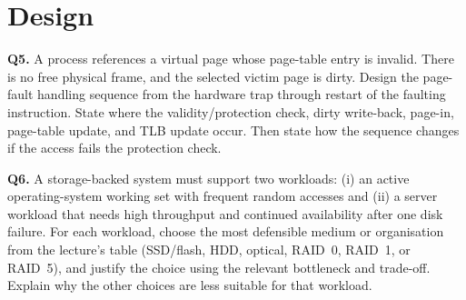 \documentclass[11pt]{article}
\begin{document}
\section{Design}

\textbf{Q5.} A process references a virtual page whose page-table entry is
invalid. There is no free physical frame, and the selected victim page is
dirty. Design the page-fault handling sequence from the hardware trap through
restart of the faulting instruction. State where the validity/protection check,
dirty write-back, page-in, page-table update, and TLB update occur. Then state
how the sequence changes if the access fails the protection check.

\textbf{Q6.} A storage-backed system must support two workloads: (i) an
active operating-system working set with frequent random accesses and (ii) a
server workload that needs high throughput and continued availability after
one disk failure. For each workload, choose the most defensible medium or
organisation from the lecture's table (SSD/flash, HDD, optical, RAID~0,
RAID~1, or RAID~5), and justify the choice using the relevant bottleneck and
trade-off. Explain why the other choices are less suitable for that workload.



\end{document}
